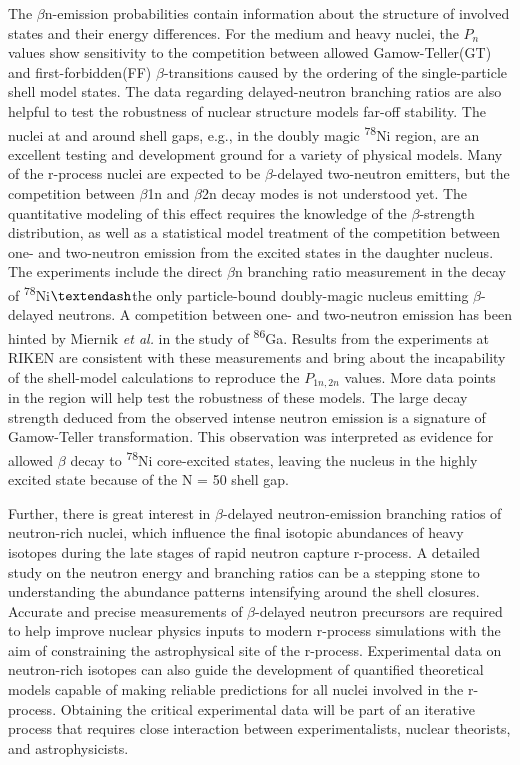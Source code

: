 The $\beta$n-emission probabilities contain information about the structure of involved states and their energy differences. For the medium and heavy nuclei, the $P_{n}$ values show sensitivity to the competition between allowed Gamow-Teller(GT) and first-forbidden(FF) $\beta$-transitions caused by the ordering of the single-particle shell model states. The data regarding delayed-neutron branching ratios are also helpful to test the robustness of nuclear structure models far-off stability. The nuclei at and around shell gaps, e.g., in the doubly magic \textsuperscript{78}Ni region, are an excellent testing and development ground for a variety of physical models. Many of the r-process \citep{burdbidge}  nuclei are expected to be $\beta$-delayed two-neutron emitters, but the competition between $\beta$1n and $\beta$2n decay modes is not understood yet. The quantitative modeling of this effect requires the knowledge of the $\beta$-strength distribution, as well as a statistical model treatment of the competition between one- and two-neutron emission from the excited states in the daughter nucleus. The experiments include the direct $\beta$n branching ratio measurement in the decay of \textsuperscript{78}Ni$\textendash$the only particle-bound doubly-magic nucleus emitting $\beta$-delayed neutrons. A competition between one- and two-neutron emission has been hinted by Miernik \textit{et al.} \citep{86Ga} in the study of \textsuperscript{86}Ga. Results from the experiments at RIKEN are consistent with these measurements and bring about the incapability of the shell-model calculations to reproduce the $P_{1n, 2n}$ values. More data points in the region will help test the robustness of these models. The large decay strength deduced from the observed intense neutron emission is a signature of Gamow-Teller transformation. This observation was interpreted as evidence for allowed $\beta$ decay to \textsuperscript{78}Ni core-excited states, leaving the nucleus in the highly excited state because of the N = 50 shell gap. 


Further, there is great interest in $\beta$-delayed neutron-emission branching ratios of neutron-rich nuclei, which influence the final isotopic abundances of heavy isotopes during the late stages of rapid neutron capture r-process. A detailed study on the neutron energy and branching ratios can be a stepping stone to understanding the abundance patterns intensifying around the shell closures. Accurate and precise measurements of $\beta$-delayed neutron precursors are required to help improve nuclear physics inputs to modern r-process simulations with the aim of constraining the astrophysical site of the r-process. Experimental data on neutron-rich isotopes can also guide the development of quantified theoretical models capable of making reliable predictions for all nuclei involved in the r-process. Obtaining the critical experimental data will be part of an iterative process that requires close interaction between experimentalists, nuclear theorists, and astrophysicists.


